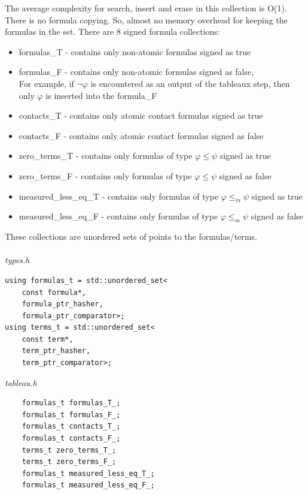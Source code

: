 \documentclass{article}
\begin{document}
	The average complexity for search, insert and erase in this collection is O(1). There is no formula copying. So, almost no memory overhead for keeping the formulas in the set.
	\newline
	\newline
	There are 8 signed formula collections:
	\begin{itemize}
		\item formulas\_T - contains only non-atomic formulas signed as true
		\item formulas\_F - contains only non-atomic formulas signed as false, \\
				For example, if $\neg\varphi$ is encountered as an output of the tableaux step, then only $\varphi$ is inserted into the formula\_F
		\item contacts\_T - contains only atomic contact formulas signed as true
		\item contacts\_F - contains only atomic contact formulas signed as false
		\item zero\_terms\_T - contains only formulas of type $\varphi \le \psi$ signed as true
		\item zero\_terms\_F - contains only formulas of type $\varphi \le \psi$ signed as false
		\item measured\_less\_eq\_T - contains only formulas of type $\varphi \le_m \psi$ signed as true
		\item measured\_less\_eq\_F - contains only formulas of type $\varphi \le_m \psi$ signed as false
	\end{itemize}

	These collections are unordered sets of points to the formulas/terms.
	\\
	\\
\noindent
\textit{types.h}
\begin{lstlisting}
using formulas_t = std::unordered_set<
	const formula*, 
	formula_ptr_hasher, 
	formula_ptr_comparator>;
using terms_t = std::unordered_set<
	const term*, 
	term_ptr_hasher, 
	term_ptr_comparator>;
\end{lstlisting}

\noindent
\textit{tableau.h}
\begin{lstlisting}
    formulas_t formulas_T_;
    formulas_t formulas_F_;
    formulas_t contacts_T_;
    formulas_t contacts_F_;
    terms_t zero_terms_T_;
    terms_t zero_terms_F_;
    formulas_t measured_less_eq_T_;
    formulas_t measured_less_eq_F_;
\end{lstlisting}
\end{document}
